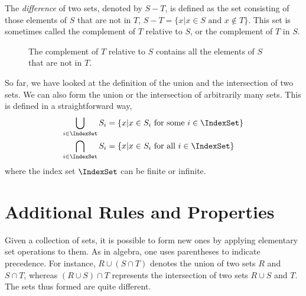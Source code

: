 The \emph{difference} of two sets, denoted by $S - T$, is defined as the set consisting of those elements of $S$ that are not in $T$, $S - T = \{ x | x \in S \text{ and } x \notin T \}$.
This set is sometimes called the complement of $T$ relative to $S$, or the complement of $T$ in $S$.

\begin{figure}[htb]
\begin{center}
\caption{The complement of $T$ relative to $S$ contains all the elements of $S$ that are not in $T$.}
\end{center}
\end{figure}

So far, we have looked at the definition of the union and the intersection of two sets.
We can also form the union or the intersection of arbitrarily many sets.
This is defined in a straightforward way,
\begin{align*}
\bigcup_{i \in \IndexSet} S_{i}
&= \{ x | x \in S_{i} \text{ for some } i \in \IndexSet \} \\
\bigcap_{i \in \IndexSet} S_{i}
&= \{ x | x \in S_{i} \text{ for all } i \in \IndexSet \}
\end{align*}
where the index set $\IndexSet$ can be finite or infinite.


\section{Additional Rules and Properties}

Given a collection of sets, it is possible to form new ones by applying elementary set operations to them.
As in algebra, one uses parentheses to indicate precedence.
For instance, $R \cup (S \cap T)$ denotes the union of two sets $R$ and $S \cap T$, whereas $(R \cup S) \cap T$ represents the intersection of two sets $R \cup S$ and $T$.
The sets thus formed are quite different.

